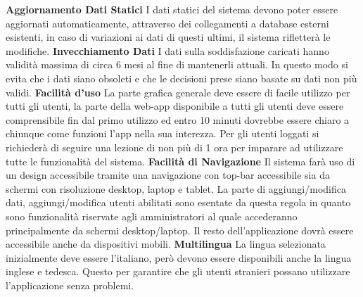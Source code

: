 \begin{rnfList}
        \rnfItem \textbf{Aggiornamento Dati Statici} I dati statici del sistema devono poter essere aggiornati automaticamente, attraverso dei collegamenti a database esterni esistenti, in caso di variazioni ai dati di questi ultimi, il sistema rifletterà le modifiche.
        \rnfItem \textbf{Invecchiamento Dati} I dati sulla soddisfazione caricati hanno validità massima di circa 6 mesi al fine di mantenerli attuali. In questo modo si evita che i dati siano obsoleti e che le decisioni prese siano basate su dati non più validi.
        \rnfItem \textbf{Facilità d'uso} La parte grafica generale deve essere di facile utilizzo per tutti gli utenti, la parte della web-app disponibile a tutti gli utenti deve essere comprensibile fin dal primo utilizzo ed entro 10 minuti dovrebbe essere chiaro a chiunque come funzioni l'app nella sua interezza. Per gli utenti loggati si richiederà di seguire una lezione di non più di 1 ora per imparare ad utilizzare tutte le funzionalità del sistema.
        \rnfItem \textbf{Facilità di Navigazione} Il sistema farà uso di un design accessibile tramite una navigazione con top-bar accessibile sia da schermi con risoluzione desktop, laptop e tablet. La parte di aggiungi/modifica dati, aggiungi/modifica utenti abilitati sono esentate da questa regola in quanto sono funzionalità riservate agli amministratori al quale accederanno principalmente da schermi desktop/laptop. Il resto dell'applicazione dovrà essere accessibile anche da dispositivi mobili.
        \rnfItem \textbf{Multilingua} La lingua selezionata inizialmente deve essere l'italiano, però devono essere disponibili anche la lingua inglese e tedesca. Questo per garantire che gli utenti stranieri possano utilizzare l'applicazione senza problemi.
    \end{rnfList}